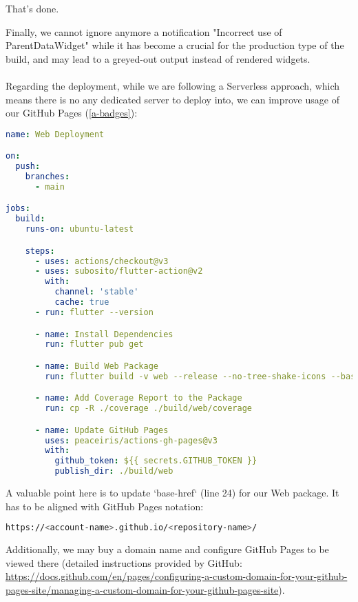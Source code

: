 \noindent That's done.

Finally, we cannot ignore anymore a notification "Incorrect use of ParentDataWidget" while it has become a crucial for 
the production type of the build, and may lead to a greyed-out output instead of rendered widgets.\\
\\

Regarding the deployment, while we are following a Serverless approach, which means there is no any dedicated server to 
deploy into, we can improve usage of our GitHub Pages (\ref{a-badges}):

\begin{lstlisting}[language=yaml]
name: Web Deployment

on:
  push:
    branches:
      - main

jobs:
  build:
    runs-on: ubuntu-latest

    steps:
      - uses: actions/checkout@v3
      - uses: subosito/flutter-action@v2
        with:
          channel: 'stable'
          cache: true
      - run: flutter --version

      - name: Install Dependencies
        run: flutter pub get

      - name: Build Web Package
        run: flutter build -v web --release --no-tree-shake-icons --base-href="/app-finance/"

      - name: Add Coverage Report to the Package
        run: cp -R ./coverage ./build/web/coverage

      - name: Update GitHub Pages 
        uses: peaceiris/actions-gh-pages@v3
        with:
          github_token: ${{ secrets.GITHUB_TOKEN }}
          publish_dir: ./build/web
\end{lstlisting}

\noindent A valuable point here is to update `base-href` (line 24) for our Web package. It has to be aligned with 
GitHub Pages notation:

\begin{lstlisting}[language=bash]
https://<account-name>.github.io/<repository-name>/
\end{lstlisting}

Additionally, we may buy a domain name and configure GitHub Pages to be viewed there (detailed instructions provided by
GitHub: \href{https://docs.github.com/en/pages/configuring-a-custom-domain-for-your-github-pages-site/managing-a-custom-domain-for-your-github-pages-site}{https://docs.github.com/en/pages/configuring-a-custom-domain-for-your-github-pages-site/managing-a-custom-domain-for-your-github-pages-site}).
